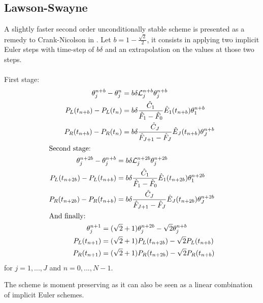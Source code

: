 \documentclass[]{rAMF2e}
\begin{document}
\subsection{Lawson-Swayne}
A slightly faster second order unconditionally stable scheme is presented as a remedy to Crank-Nicolson in \citep{lawson1976simple, lawson1978extrapolation}. Let $b=1-\frac{\sqrt{2}}{2}$, it consists in applying two implicit Euler steps with time-step of $b\delta$ and an extrapolation on the values at those two steps.\\
\\
First stage:
\begin{subequations}
\begin{align}\label{eqn_lawson_swayne}
\begin{split}
\theta_j^{n+b}-\theta_j^n &= b\delta \mathcal{L}_{j}^{n+b}\theta_j^{n+b} \\
P_L (t_{n+b}) - P_L (t_{n}) &=   b\delta \frac{\hat{C}_1}{\hat{F}_1-\hat{F}_0}\hat{E}_1(t_{n+b})\theta_1^{n+b} \\
P_R (t_{n+b}) -  P_R (t_{n}) &=b\delta \frac{\hat{C}_J}{\hat{F}_{J+1}-\hat{F}_J}\hat{E}_J(t_{n+b})\theta_J^{n+b}
\end{split}\\
\intertext{Second stage:}
\begin{split}
\theta_j^{n+2b}-\theta_j^{n+b} &= b\delta \mathcal{L}_{j}^{n+2b}\theta_j^{n+2b} \\
P_L (t_{n+2b}) - P_L (t_{n+b}) &=   b\delta \frac{\hat{C}_1}{\hat{F}_1-\hat{F}_0}\hat{E}_1(t_{n+2b})\theta_1^{n+2b} \\
P_R (t_{n+2b}) -  P_R (t_{n+b}) &=b\delta \frac{\hat{C}_J}{\hat{F}_{J+1}-\hat{F}_J}\hat{E}_J(t_{n+2b})\theta_J^{n+2b}
\end{split}\\
\intertext{And finally:}
\begin{split}
\theta_j^{n+1} &= (\sqrt{2}+1) \theta_j^{n+2b} - \sqrt{2}\theta_j^{n+b}\\
P_L(t_{n+1}) &= (\sqrt{2}+1) P_L(t_{n+2b}) - \sqrt{2} P_L(t_{n+b})\\
P_R(t_{n+1}) &= (\sqrt{2}+1)  P_R(t_{n+2b}) - \sqrt{2} P_R(t_{n+b})
\end{split}
\end{align}
\end{subequations}
for $j=1,...,J$ and $n=0,...,N-1$.

The scheme is moment preserving as it can also be seen as a linear combination of implicit Euler schemes.
\end{document}

